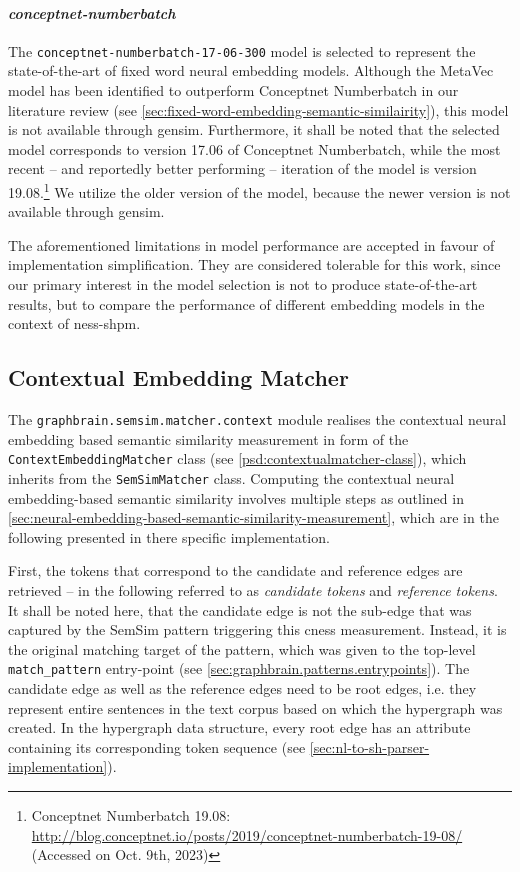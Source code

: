 \documentclass[11pt, numbers=noenddot]{scrreprt}
\begin{document}
\paragraph{\textit{conceptnet-numberbatch}} The \texttt{conceptnet-numberbatch-17-06-300} model is selected to represent the state-of-the-art of fixed word neural embedding models. Although the MetaVec model has been identified to outperform Conceptnet Numberbatch in our literature review (see \cref{sec:fixed-word-embedding-semantic-similairity}), this model is not available through gensim. Furthermore, it shall be noted that the selected model corresponds to version 17.06 of Conceptnet Numberbatch, while the most recent -- and reportedly better performing -- iteration of the model is version 19.08.\footnote{Conceptnet Numberbatch 19.08:\\\url{http://blog.conceptnet.io/posts/2019/conceptnet-numberbatch-19-08/}\\(Accessed on Oct. 9th, 2023)} We utilize the older version of the model, because the newer version is not available through gensim. 

\vspace{\baselineskip}
The aforementioned limitations in model performance are accepted in favour of implementation simplification. They are considered tolerable for this work, since our primary interest in the model selection is not to produce state-of-the-art results, but to compare the performance of different embedding models in the context of \gls{ness-shpm}.


\subsection{Contextual Embedding Matcher}
\label{sec:contextual-embedding-matcher}
The \texttt{graphbrain.semsim.matcher.context} module realises the contextual neural embedding based semantic similarity measurement in form of the \texttt{ContextEmbeddingMatcher} class (see \cref{psd:contextualmatcher-class}), which inherits from the \texttt{SemSimMatcher} class. Computing the contextual neural embedding-based semantic similarity involves multiple steps as outlined in \cref{sec:neural-embedding-based-semantic-similarity-measurement}, which are in the following presented in there specific implementation.

First, the tokens that correspond to the candidate and reference edges are retrieved -- in the following referred to as \textit{candidate tokens} and \textit{reference tokens}. It shall be noted here, that the candidate edge is not the sub-edge that was captured by the SemSim pattern triggering this \gls{cness} measurement. Instead, it is the original matching target of the pattern, which was given to the top-level \texttt{match\_pattern} entry-point (see \cref{sec:graphbrain.patterns.entrypoints}). The candidate edge as well as the reference edges need to be root edges, i.e. they represent entire sentences in the text corpus based on which the hypergraph was created.
In the hypergraph data structure, every root edge has an attribute containing its corresponding token sequence (see \cref{sec:nl-to-sh-parser-implementation}).
\end{document}
